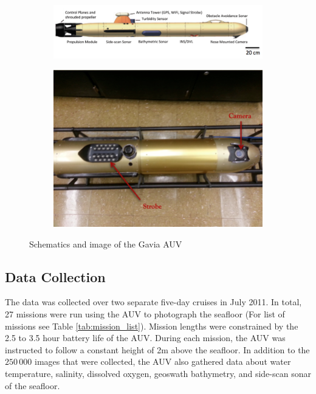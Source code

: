 \documentclass {udthesis}
\begin{document}
\begin{figure}
  \centering
  \begin{subfigure}[]{0.7\textwidth}
      \includegraphics[width=\textwidth,natwidth=1052,natheight=428]{auv_schematics}
  \end{subfigure}
  \begin{subfigure}[]{0.6\textwidth}
      \includegraphics[width=\textwidth,natwidth=690,natheight=518]{auv_image}    
  \end{subfigure}
  \caption{Schematics and image of the Gavia AUV }
  \label{fig:gavia_auv}
\end{figure}

\subsection{Data Collection}

The data was collected over two separate five-day cruises in July 2011.   
In total, 27 missions were run using the AUV to photograph the seafloor (For list of missions see Table \ref{tab:mission_list}).  
Mission lengths were constrained by the 2.5 to 3.5 hour battery life of the AUV.  
During each mission, the AUV was instructed to follow a constant height of 2\;m
above the seafloor.  In addition to the $250\,000$ images that were collected, the 
AUV also gathered data about water temperature, salinity, dissolved oxygen, 
geoswath bathymetry, and side-scan sonar of the seafloor.
\end{document}
